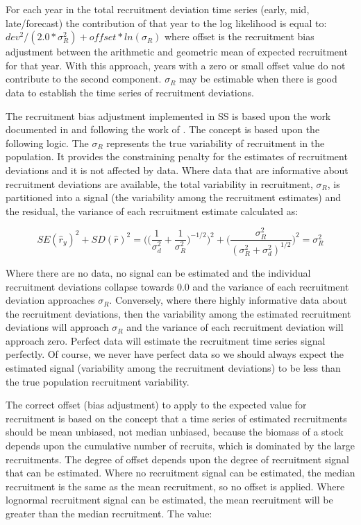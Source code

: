 \hypertarget{RecBias}{}
For each year in the total recruitment deviation time series (early, mid, late/forecast) the contribution of that year to the log likelihood is equal to:  $dev^2/(2.0*\sigma^2_R)+offset*ln(\sigma_R)$ where offset is the recruitment bias adjustment between the arithmetic and geometric mean of expected recruitment for that year.  With this approach, years with a zero or small offset value do not contribute to the second component. $\sigma_R$ may be estimable when there is good data to establish the time series of recruitment deviations.

The recruitment bias adjustment implemented in SS is based upon the work documented in \citet{methot_adjusting_2011} and following the work of \citet{maunder_estimation_2003}.  The concept is based upon the following logic.  The $\sigma_R$ represents the true variability of recruitment in the population.  It provides the constraining penalty for the estimates of recruitment deviations and it is not affected by data.  Where data that are informative about recruitment deviations are available, the total variability in recruitment, $\sigma_R$, is partitioned into a signal (the variability among the recruitment estimates) and the residual, the variance of each recruitment estimate calculated as:  

\begin{equation}
SE(\hat{r}_y)^2 + SD(\hat{r})^2=\Bigg( \bigg( \frac{1}{\sigma^2_d}+\frac{1}{\sigma^2_R}\bigg)^{-1/2}\Bigg)^2+\Bigg( \frac{\sigma^2_R}{(\sigma^2_R+\sigma^2_d)^{1/2}}\Bigg)^2=\sigma^2_R
\end{equation}

Where there are no data, no signal can be estimated and the individual recruitment deviations collapse towards 0.0 and the variance of each recruitment deviation approaches $\sigma_R$.  Conversely, where there highly informative data about the recruitment deviations, then the variability among the estimated recruitment deviations will approach $\sigma_R$ and the variance of each recruitment deviation will approach zero.  Perfect data will estimate the recruitment time series signal perfectly.  Of course, we never have perfect data so we should always expect the estimated signal (variability among the recruitment deviations) to be less than the true population recruitment variability.


The correct offset (bias adjustment) to apply to the expected value for recruitment is based on the concept that a time series of estimated recruitments should be mean unbiased, not median unbiased, because the biomass of a stock depends upon the cumulative number of recruits, which is dominated by the large recruitments.  The degree of offset depends upon the degree of recruitment signal that can be estimated.  Where no recruitment signal can be estimated, the median recruitment is the same as the mean recruitment, so no offset is applied.  Where lognormal recruitment signal can be estimated, the mean recruitment will be greater than the median recruitment.  The value:

